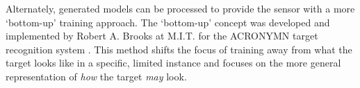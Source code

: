		Alternately, generated models can be processed to provide the sensor with a more `bottom-up' training approach. The `bottom-up' concept was developed and implemented by Robert A. Brooks at M.I.T. for the ACRONYMN target recognition system \cite{Brooks}\cite{Brooks2}. This method shifts the focus of training away from what the target looks like in a specific, limited instance and focuses on the more general representation of \textit{how} the target \textit{may} look.
